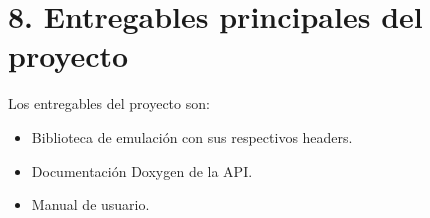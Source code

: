 \section{8. Entregables principales del proyecto}
\label{sec:8-entregables-principales-del-proyecto}

Los entregables del proyecto son:

\begin{itemize}
	\item Biblioteca de emulación con sus respectivos headers.
	\item Documentación Doxygen de la API.
	\item Manual de usuario.
\end{itemize}

